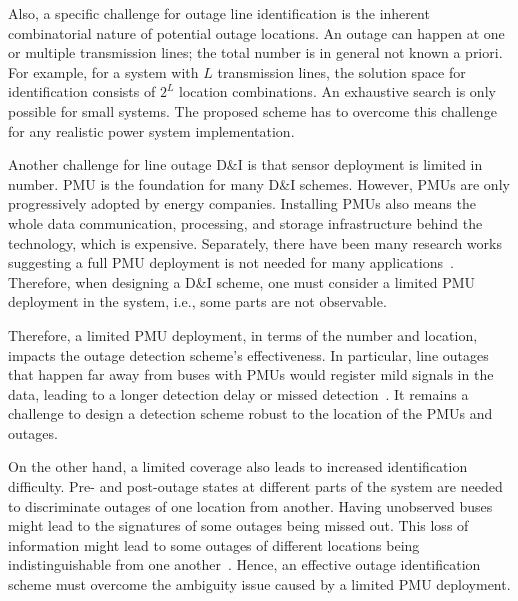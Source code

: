 Also, a specific challenge for outage line identification is the inherent combinatorial nature of potential outage locations. An outage can happen at one or multiple transmission lines; the total number is in general not known a priori. For example, for a system with $L$ transmission lines, the solution space for identification consists of $2^L$ location combinations. An exhaustive search is only possible for small systems. The proposed scheme has to overcome this challenge for any realistic power system implementation.


Another challenge for line outage D\&I is that sensor deployment is limited in number. 
PMU is the foundation for many D\&I schemes. However, PMUs are only progressively adopted by energy companies. Installing PMUs also means the whole data communication, processing, and storage infrastructure behind the technology, which is expensive. Separately, there have been many research works suggesting a full PMU deployment is not needed for many applications~\cite{aminifar2014synchrophasor}. Therefore, when designing a D\&I scheme, one must consider a limited PMU deployment in the system, i.e., some parts are not observable.

Therefore, a limited PMU deployment, in terms of the number and location, impacts the outage detection scheme’s effectiveness. In particular, line outages that happen far away from buses with PMUs would register mild signals in the data, leading to a longer detection delay or missed detection~\cite{yang2020control}. It remains a challenge to design a detection scheme robust to the location of the PMUs and outages. 

On the other hand, a limited coverage also leads to increased identification difficulty. Pre- and post-outage states at different parts of the system are needed to discriminate outages of one location from another. Having unobserved buses might lead to the signatures of some outages being missed out. This loss of information might lead to some outages of different locations being indistinguishable from one another~\cite{Wu2015,Costilla-Enriquez2019,yang2021particle}. Hence, an effective outage identification scheme must overcome the ambiguity issue caused by a limited PMU deployment.



